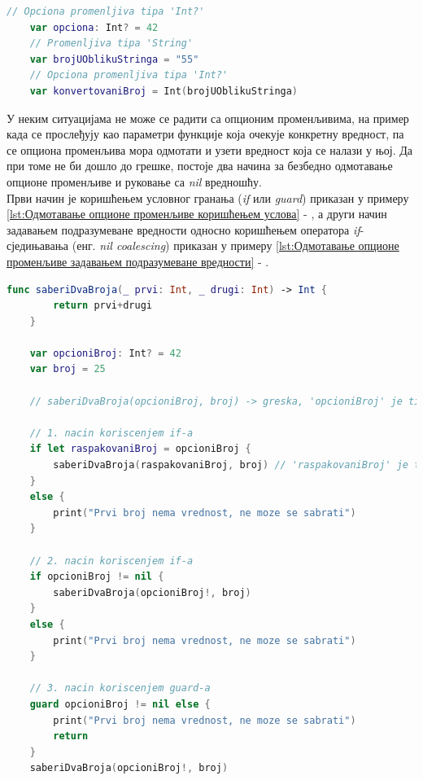 \documentclass[12pt,oneside]{memoir}
\begin{document}
\begin{lstlisting}[caption=\textit{{Дефинисање опционе променљиве}}, label={lst:Дефинисање опционе променљиве}, language=Swift, frame=single]
    // Opciona promenljiva tipa 'Int?'
    var opciona: Int? = 42
    // Promenljiva tipa 'String'
    var brojUOblikuStringa = "55"
    // Opciona promenljiva tipa 'Int?'
    var konvertovaniBroj = Int(brojUOblikuStringa)
\end{lstlisting}

\indent У неким ситуацијама не може се радити са опционим променљивима, на пример када се прослеђују као параметри функције која очекује конкретну вредност, па се опциона променљива мора одмотати и узети вредност која се налази у њој. Да при томе не би дошло до грешке, постоје два начина за безбедно одмотавање опционе променљиве и руковање са \textit{nil} вредношћу.
\\
\indent Први начин је коришћењем условног гранања (\textit{if} или \textit{guard}) приказан у примеру \ref{lst:Одмотавање опционе променљиве коришћењем услова} - , а други начин задавањем подразумеване вредности односно коришћењем оператора \textit{if}-сједињавања (енг. \textit{nil coalescing}) приказан у примеру \ref{lst:Одмотавање опционе променљиве задавањем подразумеване вредности} - .

\begin{lstlisting}[caption=\textit{{Одмотавање опционе променљиве коришћењем услова}}, label={lst:Одмотавање опционе променљиве коришћењем услова}, language=Swift, frame=single]
    func saberiDvaBroja(_ prvi: Int, _ drugi: Int) -> Int {
        return prvi+drugi
    }
    
    var opcioniBroj: Int? = 42
    var broj = 25
    
    // saberiDvaBroja(opcioniBroj, broj) -> greska, 'opcioniBroj' je tipa Int? dok funkcija ocekuje parametar tipa Int
    
    // 1. nacin koriscenjem if-a
    if let raspakovaniBroj = opcioniBroj {
        saberiDvaBroja(raspakovaniBroj, broj) // 'raspakovaniBroj' je tipa Int
    }
    else {
        print("Prvi broj nema vrednost, ne moze se sabrati")
    }
    
    // 2. nacin koriscenjem if-a
    if opcioniBroj != nil {
        saberiDvaBroja(opcioniBroj!, broj)
    }
    else {
        print("Prvi broj nema vrednost, ne moze se sabrati")
    }
    
    // 3. nacin koriscenjem guard-a
    guard opcioniBroj != nil else {
        print("Prvi broj nema vrednost, ne moze se sabrati")
        return
    }
    saberiDvaBroja(opcioniBroj!, broj)
\end{lstlisting}
\end{document}
